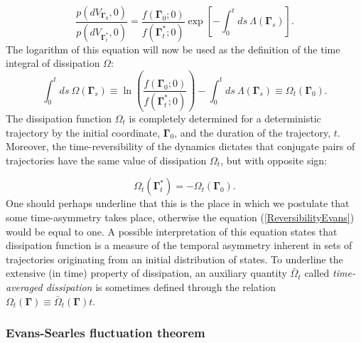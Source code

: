 \documentclass[a4paper,12pt]{article}
\begin{document}
\begin{equation}
  \frac{p(d V_{\bm{\Gamma}_0}, 0)}{p(d V_{\bm{\Gamma}_t^*},0)}=
  \frac{f(\bm{\Gamma}_0;0)}{f(\bm{\Gamma}_t^*;0)} 
  \exp[-\int_0^t ds \ \Lambda(\bm{\Gamma}_s)].
\end{equation}
The logarithm of this equation will now be used as the definition of the time integral of dissipation $\Omega$:
\begin{equation}
  \label{Dissipation}
  \int_0^t ds\ \Omega(\bm{\Gamma}_s)\equiv \ln(\frac{f(\bm{\Gamma}_0;0)}{f(\bm{\Gamma}_t^*;0)}) -\int_0^t ds \ \Lambda(\bm{\Gamma}_s) \equiv \Omega_t(\bm{\Gamma}_0).
\end{equation}
The dissipation function $\Omega_t$ is completely determined for a deterministic trajectory by the initial coordinate, $\bm{\Gamma}_0$, and the duration of the trajectory, $t$. Moreover, the time-reversibility of the dynamics dictates that conjugate pairs of trajectories have the same value of dissipation $\Omega_t$, but with opposite sign:

\begin{equation}
  \Omega_t(\bm{\Gamma}_t^*)=-\Omega_t(\bm{\Gamma}_0).
\end{equation}
One should perhaps underline that this is the place in which we postulate that some time-asymmetry takes place, otherwise the equation (\ref{ReversibilityEvans}) would be equal to one.
A possible interpretation of this equation states that dissipation function is a measure of the temporal asymmetry inherent in sets of trajectories originating from an initial distribution of states.
To underline the extensive (in time) property of dissipation, an auxiliary quantity $\bar{\Omega}_t$ called \textit{time-averaged dissipation} is sometimes defined through the relation $\Omega_t(\bm{\Gamma}) \equiv \bar{\Omega}_t(\bm{\Gamma})t$.

\subsubsection{Evans-Searles fluctuation theorem}
\end{document}
